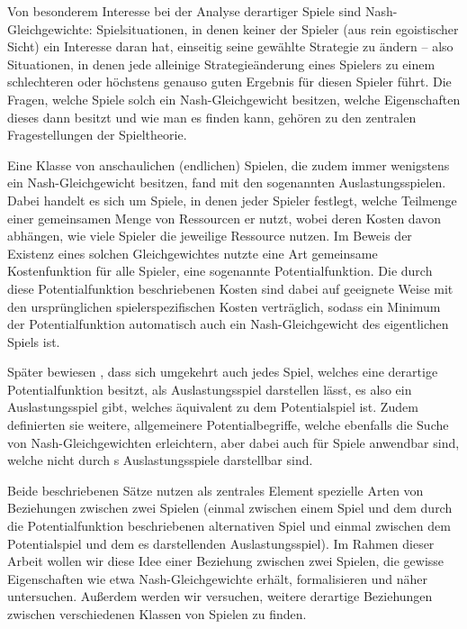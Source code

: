 \documentclass[a4paper,ngerman,11pt,bibliography=totoc]{scrartcl}
\theoremstyle{definition}
\theoremstyle{plain}
\theoremstyle{remark}
\begin{document}
Von besonderem Interesse bei der Analyse derartiger Spiele sind Nash-Gleichgewichte: Spielsituationen, in denen keiner der Spieler (aus rein egoistischer Sicht) ein Interesse daran hat, einseitig seine gewählte Strategie zu ändern -- also Situationen, in denen jede alleinige Strategieänderung eines Spielers zu einem schlechteren oder höchstens genauso guten Ergebnis für diesen Spieler führt. Die Fragen, welche Spiele solch ein Nash-Gleichgewicht besitzen, welche Eigenschaften dieses dann besitzt und wie man es finden kann, gehören zu den zentralen Fragestellungen der Spieltheorie.

Eine Klasse von anschaulichen (endlichen) Spielen, die zudem immer wenigstens ein Nash-Gleichgewicht besitzen, fand \citeauthor{RosenthalPotential} mit den sogenannten Auslastungsspielen. Dabei handelt es sich um Spiele, in denen jeder Spieler festlegt, welche Teilmenge einer gemeinsamen Menge von Ressourcen er nutzt, wobei deren Kosten davon abhängen, wie viele Spieler die jeweilige Ressource nutzen. Im Beweis der Existenz eines solchen Gleichgewichtes nutzte \citeauthor{RosenthalPotential} eine Art gemeinsame Kostenfunktion für alle Spieler, eine sogenannte Potentialfunktion. Die durch diese Potentialfunktion beschriebenen Kosten sind dabei auf geeignete Weise mit den ursprünglichen spielerspezifischen Kosten verträglich, sodass ein Minimum der Potentialfunktion automatisch auch ein Nash-Gleichgewicht des eigentlichen Spiels ist.

Später bewiesen \citeauthor{MonShap}, dass sich umgekehrt auch jedes Spiel, welches eine derartige Potentialfunktion besitzt, als Auslastungsspiel darstellen lässt, es also ein Auslastungsspiel gibt, welches äquivalent zu dem Potentialspiel ist. Zudem definierten sie weitere, allgemeinere Potentialbegriffe, welche ebenfalls die Suche von Nash-Gleichgewichten erleichtern, aber dabei auch für Spiele anwendbar sind, welche nicht durch \citeauthor{RosenthalPotential}s Auslastungsspiele darstellbar sind. 

Beide beschriebenen Sätze nutzen als zentrales Element spezielle Arten von Beziehungen zwischen zwei Spielen (einmal zwischen einem Spiel und dem durch die Potentialfunktion beschriebenen alternativen Spiel und einmal zwischen dem Potentialspiel und dem es darstellenden Auslastungsspiel). Im Rahmen dieser Arbeit wollen wir diese Idee einer Beziehung zwischen zwei Spielen, die gewisse Eigenschaften wie etwa Nash-Gleichgewichte erhält, formalisieren und näher untersuchen. Außerdem werden wir versuchen, weitere derartige Beziehungen zwischen verschiedenen Klassen von Spielen zu finden.
\end{document}

